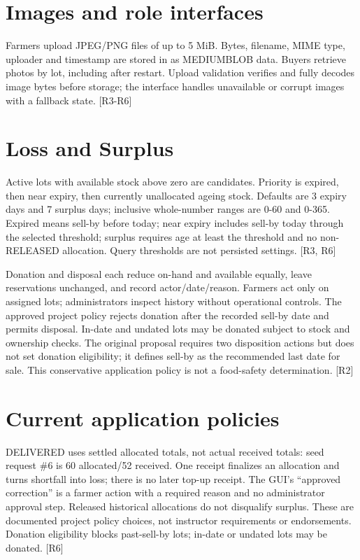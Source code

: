 \documentclass[12pt,a4paper]{report}
\begin{document}
\section{Images and role interfaces}
Farmers upload JPEG/\allowbreak{}PNG files of up to 5 MiB. Bytes, filename, MIME type, uploader and timestamp are stored in  as MEDIUMBLOB data. Buyers retrieve photos by lot, including after restart. Upload validation verifies and fully decodes image bytes before storage; the interface handles unavailable or corrupt images with a fallback state. [R3-R6]

\section{Loss and Surplus}
Active lots with available stock above zero are candidates. Priority is expired, then near expiry, then currently unallocated ageing stock. Defaults are 3 expiry days and 7 surplus days; inclusive whole-number ranges are 0-60 and 0-365. Expired means sell-by before today; near expiry includes sell-by today through the selected threshold; surplus requires age at least the threshold and no non-RELEASED allocation. Query thresholds are not persisted settings. [R3, R6]

Donation and disposal each reduce on-hand and available equally, leave reservations unchanged, and record actor/\allowbreak{}date/\allowbreak{}reason. Farmers act only on assigned lots; administrators inspect history without operational controls. The approved project policy rejects donation after the recorded sell-by date and permits disposal. In-date and undated lots may be donated subject to stock and ownership checks. The original proposal requires two disposition actions but does not set donation eligibility; it defines sell-by as the recommended last date for sale. This conservative application policy is not a food-safety determination. [R2]

\section{Current application policies}
DELIVERED uses settled allocated totals, not actual received totals: seed request \#6 is 60 allocated/\allowbreak{}52 received. One receipt finalizes an allocation and turns shortfall into loss; there is no later top-up receipt. The GUI's ``approved correction'' is a farmer action with a required reason and no administrator approval step. Released historical allocations do not disqualify surplus. These are documented project policy choices, not instructor requirements or endorsements. Donation eligibility blocks past-sell-by lots; in-date or undated lots may be donated.  [R6]
\end{document}
